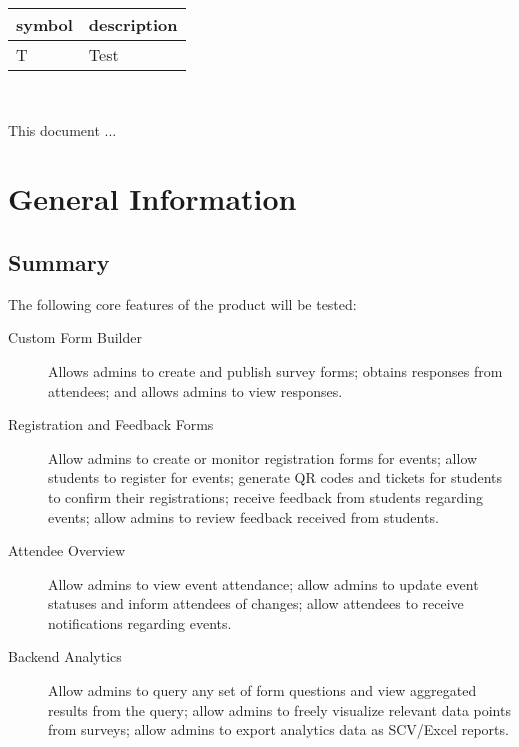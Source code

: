 \documentclass[12pt, titlepage]{article}
\begin{document}
\renewcommand{\arraystretch}{1.2}
\begin{tabular}{l l}
  \toprule
  \textbf{symbol} & \textbf{description}\\
  \midrule
  T & Test\\
  \bottomrule
\end{tabular}\\



\newpage


This document ... 

\section{General Information}

\subsection{Summary}

The following core features of the product will be tested:

\begin{description}
  \item[Custom Form Builder] Allows admins to create and publish survey forms; obtains responses from attendees; and
    allows admins to view responses.
  \item[Registration and Feedback Forms] Allow admins to create or monitor registration forms for events; allow students
    to register for events; generate QR codes and tickets for students to confirm their registrations; receive feedback
    from students regarding events; allow admins to review feedback received from students.
  \item[Attendee Overview] Allow admins to view event attendance; allow admins to update event statuses and inform
    attendees of changes; allow attendees to receive notifications regarding events.
  \item[Backend Analytics] Allow admins to query any set of form questions and view aggregated results from the query;
    allow admins to freely visualize relevant data points from surveys; allow admins to export analytics data as
    SCV/Excel reports.
\end{description}
\end{document}
